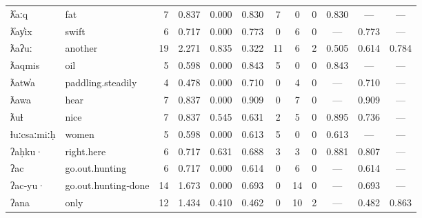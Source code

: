 \begin{landscape}
\begin{longtable}[c]{ l l | r r c c | c c c | c c c }
  ƛ̓aːq               & fat                       & 7   & 0.837                     & 0.000           & 0.830      & 7         & 0           & 0            & 0.830     & —           & —\\
  ƛ̓ay̓ix              & swift                     & 6   & 0.717                     & 0.000           & 0.773      & 0         & 6           & 0            & —         & 0.773       & —\\
  ƛaʔuː              & another                   & 19  & 2.271                     & 0.835           & 0.322      & 11        & 6           & 2            & 0.505     & 0.614       & 0.784\\
  ƛaqmis             & oil                       & 5   & 0.598                     & 0.000           & 0.843      & 5         & 0           & 0            & 0.843     & —           & —\\
  ƛatw̓a              & paddling.steadily         & 4   & 0.478                     & 0.000           & 0.710      & 0         & 4           & 0            & —         & 0.710       & —\\
  ƛawa               & hear                      & 7   & 0.837                     & 0.000           & 0.909      & 0         & 7           & 0            & —         & 0.909       & —\\
  ƛuɬ                & nice                      & 7   & 0.837                     & 0.545           & 0.631      & 2         & 5           & 0            & 0.895     & 0.736       & —\\
  ɬuːcsaːmiːḥ        & women                     & 5   & 0.598                     & 0.000           & 0.613      & 5         & 0           & 0            & 0.613     & —           & —\\
  ʔaḥku·             & right.here                & 6   & 0.717                     & 0.631           & 0.688      & 3         & 3           & 0            & 0.881     & 0.807       & —\\
  ʔac                & go.out.hunting            & 6   & 0.717                     & 0.000           & 0.614      & 0         & 6           & 0            & —         & 0.614       & —\\
  ʔac‑yu·            & go.out.hunting‑done       & 14  & 1.673                     & 0.000           & 0.693      & 0         & 14          & 0            & —         & 0.693       & —\\
  ʔana               & only                      & 12  & 1.434                     & 0.410           & 0.462      & 0         & 10          & 2            & —         & 0.482       & 0.863\\

\end{longtable}
\end{landscape}
